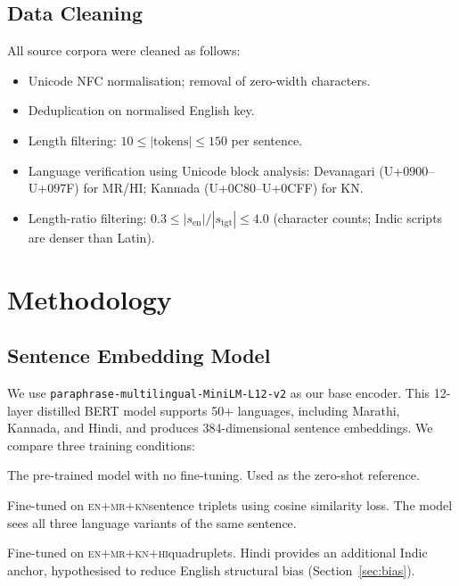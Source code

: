 \documentclass[11pt,a4paper]{article}
\newcommand{\mr}{\textsc{mr}}
\newcommand{\kn}{\textsc{kn}}
\newcommand{\en}{\textsc{en}}
\newcommand{\hi}{\textsc{hi}}
\begin{document}
\subsection{Data Cleaning}
All source corpora were cleaned as follows:
\begin{itemize}[leftmargin=*]
  \item Unicode NFC normalisation; removal of zero-width characters.
  \item Deduplication on normalised English key.
  \item Length filtering: $10 \leq |\text{tokens}| \leq 150$ per sentence.
  \item Language verification using Unicode block analysis:
    Devanagari (U+0900--U+097F) for MR/HI;
    Kannada (U+0C80--U+0CFF) for KN.
  \item Length-ratio filtering: $0.3 \leq |s_\text{en}|/|s_\text{tgt}| \leq 4.0$
    (character counts; Indic scripts are denser than Latin).
\end{itemize}

\section{Methodology}
\label{sec:method}

\subsection{Sentence Embedding Model}

We use \texttt{paraphrase-multilingual-MiniLM-L12-v2}
as our base encoder.
This 12-layer distilled BERT model supports 50+ languages,
including Marathi, Kannada, and Hindi, and produces
384-dimensional sentence embeddings.
We compare three training conditions:

\begin{description}[leftmargin=*, font=\bfseries]
  \item[Baseline] The pre-trained model with no fine-tuning.
    Used as the zero-shot reference.
  \item[Triplet] Fine-tuned on \en+\mr+\kn sentence triplets
    using cosine similarity loss. The model sees all three
    language variants of the same sentence.
  \item[Quadruplet] Fine-tuned on \en+\mr+\kn+\hi quadruplets.
    Hindi provides an additional Indic anchor, hypothesised to
    reduce English structural bias (Section~\ref{sec:bias}).
\end{description}
\end{document}
